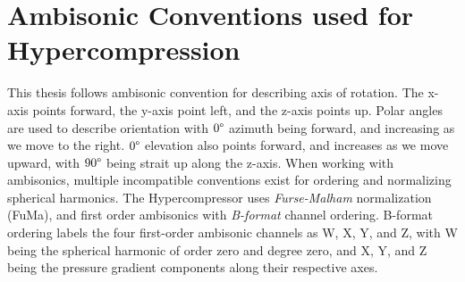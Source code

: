 \section{Ambisonic Conventions used for Hypercompression}
\label{sec:ambis-conv-used}
This thesis follows ambisonic convention for describing axis of
rotation. The x-axis points forward, the y-axis point left, and the
z-axis points up. Polar angles are used to describe orientation with
$0\degree$ azimuth being forward, and increasing as we move to the
right. $0\degree$ elevation also points forward, and increases as we
move upward, with $90\degree$ being strait up along the z-axis. When
working with ambisonics, multiple incompatible conventions exist for
ordering and normalizing spherical harmonics.\cite{Nachbar2011b} The
Hypercompressor uses \textit{Furse-Malham} normalization
(FuMa)\cite{Malham2003}, and first order ambisonics with
\textit{B-format}\cite{Hollerweger2008} channel ordering. B-format
ordering labels the four first-order ambisonic channels as W, X, Y,
and Z, with W being the spherical harmonic of order zero and degree zero,
and X, Y, and Z being the pressure gradient components along their
respective axes. 

